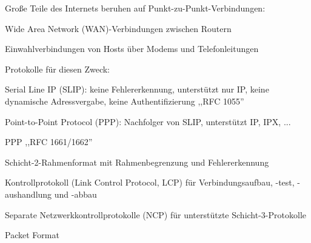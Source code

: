 \documentclass[a4paper]{article}
\begin{document}
\begin{multicols}{3}
      \begin{itemize*}
            \item Große Teile des Internets beruhen auf Punkt-zu-Punkt-Verbindungen:
            \begin{itemize*}
                  \item Wide Area Network (WAN)-Verbindungen zwischen Routern
                  \item Einwahlverbindungen von Hosts über Modems und Telefonleitungen
            \end{itemize*}
            \item Protokolle für diesen Zweck:
            \begin{itemize*}
                  \item Serial Line IP (SLIP): keine Fehlererkennung, unterstützt nur IP, keine dynamische Adressvergabe, keine Authentifizierung ,,RFC 1055''
                  \item Point-to-Point Protocol (PPP): Nachfolger von SLIP, unterstützt IP, IPX, ...
            \end{itemize*}
            \item PPP ,,RFC 1661/1662''
            \begin{itemize*}
                  \item Schicht-2-Rahmenformat mit Rahmenbegrenzung und Fehlererkennung
                  \item Kontrollprotokoll (Link Control Protocol, LCP) für Verbindungsaufbau, -test, -aushandlung und -abbau
                  \item Separate Netzwerkkontrollprotokolle (NCP) für unterstützte Schicht-3-Protokolle
            \end{itemize*}
      \end{itemize*}

      Packet Format


\end{multicols}
\end{document}
